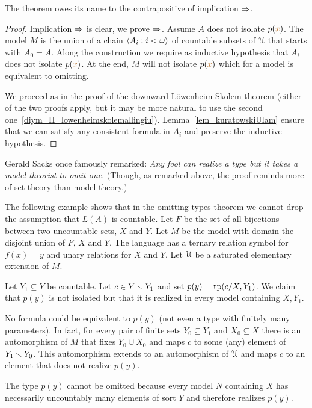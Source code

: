 \documentclass[creche.tex]{subfiles}
\begin{document}
The theorem owes its name to the contrapositive of implication $\Rightarrow$.

\begin{proof}
Implication $\Rightarrow$ is clear, we prove $\Rightarrow$.
Assume $A$ does not isolate $p({\color{brown} x})$.
The model $M$ is the union of a chain $\langle A_i:i<\omega\rangle$ of countable subsets of $\EuScript U$ that starts with $A_0=A$.
Along the construction we require as inductive hypothesis that $A_i$ does not isolate $p({\color{brown} x})$.
At the end, $M$ will not isolate $p({\color{brown} x})$ which for a model is equivalent to omitting.

We proceed as in the proof of the downward L\"owenheim-Skolem theorem (either of the two proofs apply, but it may be more natural to use the second one~\ref{diym_II_lowenheimskolemallingiu}).
Lemma~\ref{lem_kuratowskiUlam} ensure that we can satisfy any consistent formula in $A_i$ and preserve the inductive hypothesis.
\end{proof}

Gerald Sacks once famously remarked: \textit{Any fool can realize a type but it takes a model theorist to omit one}.
(Though, as remarked above, the proof reminds more of set theory than model theory.)



\begin{example}\label{ex_AK}
The following example shows that in the omitting types theorem we cannot drop the assumption that $L(A)$ is countable.
Let $F$ be the set of all bijections between two uncountable sets, $X$ and $Y$.
Let $M$ be the model with domain the disjoint union of $F$, $X$ and $Y$.
The language has a ternary relation symbol for $f(x)=y$ and unary relations for $X$ and $Y$.
Let $\EuScript U$ be a saturated elementary extension of $M$.

Let $Y_1\subseteq Y$ be countable.
Let $c\in Y\smallsetminus Y_1$ and set $p(y)={\rm tp}(c/X,Y_1)$.
We claim that $p(y)$ is not isolated but that it is realized in every model containing $X,Y_1$.

No formula could be equivalent to $p(y)$ (not even a type with finitely many parameters).
In fact, for every pair of finite sets $Y_0\subseteq Y_1$ and $X_0\subseteq X$ there is an automorphism of $M$ that fixes $Y_0\cup X_0$ and maps $c$ to some (any) element of $Y_1\smallsetminus Y_0$.
This automorphism extends to an automorphism of $\EuScript U$ and maps $c$ to an element that does not realize $p(y)$.
 
The type $p(y)$ cannot be omitted because every model $N$ containing  $X$ has necessarily uncountably many elements of sort $Y$ and therefore realizes $p(y)$.\QED
\end{example}
\end{document}
